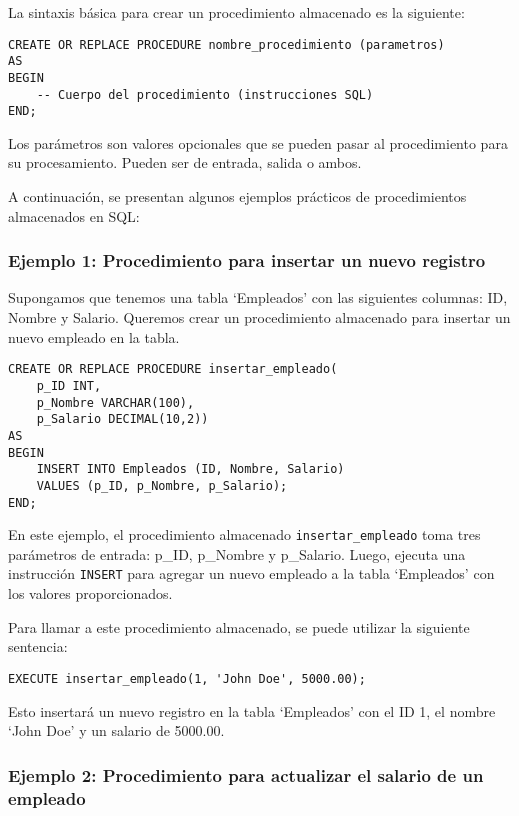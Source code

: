 \documentclass[executivepaper]{article}
\begin{document}
La sintaxis básica para crear un procedimiento almacenado es la siguiente:

\begin{lstlisting}
CREATE OR REPLACE PROCEDURE nombre_procedimiento (parametros)
AS
BEGIN
    -- Cuerpo del procedimiento (instrucciones SQL)
END;
\end{lstlisting}

Los parámetros son valores opcionales que se pueden pasar al procedimiento para su procesamiento. Pueden ser de entrada, salida o ambos.

A continuación, se presentan algunos ejemplos prácticos de procedimientos almacenados en SQL:

\subsubsection*{Ejemplo 1: Procedimiento para insertar un nuevo registro}

Supongamos que tenemos una tabla \enquote*{Empleados} con las siguientes columnas: ID, Nombre y Salario. Queremos crear un procedimiento almacenado para insertar un nuevo empleado en la tabla.

\begin{lstlisting}
CREATE OR REPLACE PROCEDURE insertar_empleado(
    p_ID INT,
    p_Nombre VARCHAR(100),
    p_Salario DECIMAL(10,2))
AS
BEGIN
    INSERT INTO Empleados (ID, Nombre, Salario)
    VALUES (p_ID, p_Nombre, p_Salario);
END;
\end{lstlisting}

En este ejemplo, el procedimiento almacenado \lstinline{insertar_empleado} toma tres parámetros de entrada: p\_ID, p\_Nombre y p\_Salario. Luego, ejecuta una instrucción \lstinline{INSERT} para agregar un nuevo empleado a la tabla \enquote*{Empleados} con los valores proporcionados.

Para llamar a este procedimiento almacenado, se puede utilizar la siguiente sentencia:

\begin{lstlisting}
EXECUTE insertar_empleado(1, 'John Doe', 5000.00);
\end{lstlisting}

Esto insertará un nuevo registro en la tabla \enquote*{Empleados} con el ID 1, el nombre \enquote*{John Doe} y un salario de 5000.00.

\subsubsection*{Ejemplo 2: Procedimiento para actualizar el salario de un empleado}
\end{document}
